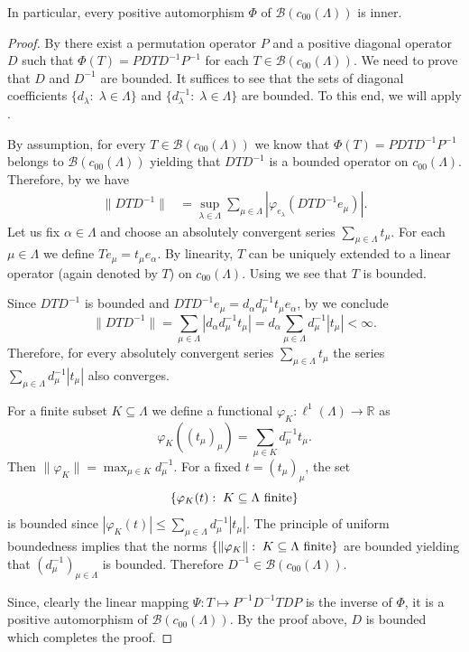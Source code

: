 \documentclass[12pt,reqno]{amsart}
\theoremstyle{plain}
\theoremstyle{definition}
\newcommand{\RR}{\mathbb{R}}
\renewcommand{\le}{\leqslant}
\begin{document}
In particular, every positive automorphism $\Phi$ of $\mathscr B(c_{00}(\Lambda))$ is inner. 

\begin{proof}
By  there exist a permutation operator $P$ and a positive diagonal operator $D$ such that $\Phi(T)=PDTD^{-1}P^{-1}$ for each $T\in \mathscr B(c_{00}(\Lambda))$. We need to prove that $D$ and $D^{-1}$ are bounded. It suffices to see that the sets of diagonal coefficients $\{d_\lambda:\; \lambda\in \Lambda\}$ and $\{d_\lambda^{-1}:\; \lambda\in \Lambda\}$ are bounded. To this end, we will apply . 

By assumption,  for every $T\in\mathscr B(c_{00}(\Lambda))$ we know that $\Phi(T)=PDTD^{-1}P^{-1}$ belongs to $\mathscr B(c_{00}(\Lambda))$ yielding that $DTD^{-1}$ is a bounded operator on $c_{00}(\Lambda)$.  Therefore, by  we have
\begin{align*}
\|DTD^{-1}\| &= \sup_{\lambda\in\Lambda} \sum_{\mu\in\Lambda} |\varphi_{e_\lambda}(DTD^{-1}e_\mu)|.
\end{align*}
Let us fix $\alpha\in\Lambda$ and choose an absolutely convergent series $\sum_{\mu\in \Lambda}t_\mu$. 
For each $\mu\in\Lambda$ we define $Te_\mu=t_\mu e_\alpha$. By linearity, $T$ can be uniquely extended to a linear operator (again denoted by $T$) on $c_{00}(\Lambda)$. Using  we see that $T$ is bounded. 

Since $DTD^{-1}$ is bounded and  $DTD^{-1}e_{\mu}=d_{\alpha}d_{\mu}^{-1} t_\mu e_\alpha$, by  we conclude
$$\|DTD^{-1}\|=\sum_{\mu\in\Lambda} |{d_{\alpha}}d_{\mu}^{-1} t_\mu|=d_\alpha \sum_{\mu\in\Lambda} d_\mu^{-1}|t_{\mu}|<\infty.$$
Therefore, for every absolutely convergent series $\sum_{\mu\in \Lambda}t_\mu$ the series $\sum_{\mu\in\Lambda} d_\mu^{-1}|t_{\mu}|$ also converges.

For a finite subset $K\subseteq\Lambda$ we define a functional $\varphi_K\colon\ell^1(\Lambda)\to\RR$ as
$$\varphi_K((t_\mu)_\mu)=\sum_{\mu\in K} d_\mu^{-1}t_\mu.$$
Then $\|\varphi_K\|=\max_{\mu\in K} d_\mu^{-1}$. For a fixed $t=(t_\mu)_\mu$, the set 
$$\{\varphi_K(t):\; K\subseteq \Lambda\ {\rm finite}\}$$ is bounded since $|\varphi_K(t)|\le \sum_{\mu\in \Lambda} d_\mu^{-1}|t_\mu|$. The principle of uniform boundedness implies that the norms $\{\|\varphi_K\|:\; K\subseteq \Lambda\ {\rm finite}\}$ are bounded yielding that $(d_\mu^{-1})_{\mu\in\Lambda}$ is bounded. Therefore $D^{-1}\in\mathscr B(c_{00}(\Lambda))$.

Since, clearly the linear mapping $\Psi\colon T\mapsto P^{-1}D^{-1}TDP$ is the inverse of $\Phi$, it is a positive automorphism of $\mathscr B(c_{00}(\Lambda))$. By the proof above, $D$ is bounded which completes the proof.
\end{proof}
\end{document}
